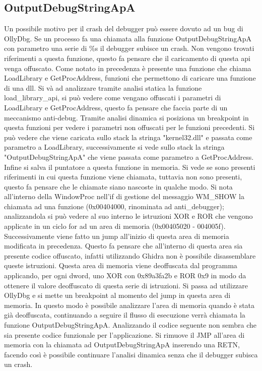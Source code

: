\documentclass[a4paper,12pt]{article}
\begin{document}
\subsection{OutputDebugStringApA}
Un possibile motivo per il crash del debugger può essere dovuto ad un bug di OllyDbg. Se un processo fa una chiamata alla funzione OutputDebugStringApA con parametro una serie di \%s il debugger subisce un crash. Non vengono trovati riferimenti a questa funzione, questo fa pensare che il caricamento di questa api venga offuscato. Come notato in precedenza è presente una funzione che chiama LoadLibrary e GetProcAddress, funzioni che permettono di caricare una funzione di una dll. Si và ad analizzare tramite analisi statica la funzione load\_library\_api, si può vedere come vengano offuscati i parametri di LoadLibrary e GetProcAddress, questo fa pensare che faccia parte di un meccanismo anti-debug. Tramite analisi dinamica si posiziona un breakpoint in questa funzioni per vedere i parametri non offuscati per le funzioni precedenti. Si può vedere che viene caricata sullo stack la stringa "kernel32.dll" e passata come parametro a LoadLibrary, successivamente si vede sullo stack la stringa "OutputDebugStringApA" che viene passata come parametro a GetProcAddress. Infine si salva il puntatore a questa funzione in memoria. Si vede se sono presenti riferimenti in cui questa funzione viene chiamata, tuttavia non sono presenti, questo fa pensare che le chiamate siano nascoste in qualche modo.  Si nota all'interno della WindowProc nell'if di gestione del messaggio WM\_SHOW la chiamata ad una funzione (0x00404000, rinominata ad anti\_debugger); analizzandola si può vedere al suo interno le istruzioni XOR e ROR che vengono applicate in un ciclo for ad un area di memoria (0x00405020 - 004005f).
 Successivamente viene fatto un jump all'inizio di questa area di memoria modificata in precedenza. Questo fa pensare che all'interno di questa area sia presente codice offuscato, infatti utilizzando Ghidra non è possibile disassemblare queste istruzioni.  Questa area di memoria viene deoffuscata dal programma applicando, per ogni dword, uno XOR con 0x89a3fa2b e ROR 0x9 in modo da ottenere il valore deoffuscato di questa serie di istruzioni.
 Si passa ad utilizzare OllyDbg e si mette un breakpoint al momento del jump in questa area di memoria. In questo modo è possibile analizzare l'area di memoria quando è stata già deoffuscata, continuando a seguire il flusso di esecuzione verrà chiamata la funzione OutputDebugStringApA. Analizzando il codice seguente non sembra che sia presente codice funzionale per l'applicazione. Si rimuove il JMP all'area di memoria con la chiamata ad OutputDebugStringApA inserendo una RETN, facendo così è possibile continuare l'analisi dinamica senza che il debugger subisca un crash.
\end{document}
